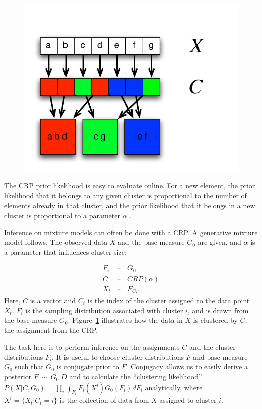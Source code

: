 \begin{figure}[t]
\begin{center}
\includegraphics[width=0.4\linewidth]{figures/crp-mixture.pdf}
\caption{}
\label{intro:crp-mixture}
\end{center}
\end{figure}


The CRP prior likelihood is easy to evaluate online. For a new element, the prior likelihood that it belongs to any given cluster is proportional to the number of elements already in that cluster, and the prior likelihood that it belongs in a new cluster is proportional to a parameter $\alpha$ .

Inference on mixture models can often be done with a CRP. A generative mixture model follows. The observed data $X$ and the base measure $G_0$ are given, and $\alpha$ is a parameter that influences cluster size:

\begin{eqnarray}
F_i&\sim&G_0\\
C&\sim&CRP(\alpha)\\
X_t&\sim&F_{C_t}.
\end{eqnarray}
Here, $C$ is a vector and $C_t$ is the index of the cluster assigned to the data point $X_t$. $F_i$ is the sampling distribution associated with cluster $i$, and is drawn from the base measure $G_0$. Figure~\ref{intro:crp-mixture} illustrates how the data in $X$ is clustered by $C$, the assignment from the CRP.

The task here is to perform inference on the assignments $C$ and the cluster distributions $F_i$. It is useful to choose cluster distributions $F$ and base measure $G_0$ such that $G_0$ is conjugate prior to $F$. Conjugacy allows us to easily derive a posterior $F~\sim~G_0|D$ and to calculate the ``clustering likelihood'' $P(X|C,G_0)=\prod_i\int_{F_i} F_i(X^i)G_0(F_i)dF_i$ analytically, where $X^i=\{X_t|C_t=i\}$ is the collection of data from $X$ assigned to cluster $i$. 

